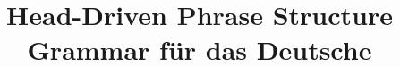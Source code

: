 
\let\mc=\multicolumn

\title{Head-Driven Phrase Structure Grammar für das Deutsche}


\hypersetup{bookmarksopen=false}

\huberlintitlepage[22pt]











% 
% 
% 
% 
% 
% 

\appendix






